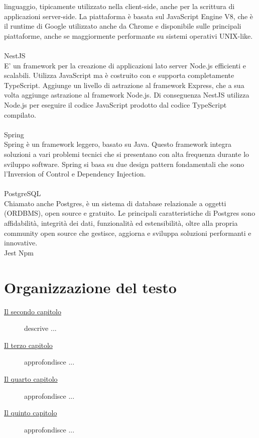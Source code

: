 linguaggio, tipicamente utilizzato nella client-side, anche per la scrittura di applicazioni server-side.
La piattaforma è basata sul JavaScript Engine V8, che è il runtime di Google utilizzato anche da Chrome e 
disponibile sulle principali piattaforme, anche se maggiormente performante su sistemi operativi UNIX-like.
\\\\
NestJS
\\
E' un framework per la creazione di applicazioni lato server Node.js efficienti e scalabili. 
Utilizza JavaScript ma è costruito con e supporta completamente TypeScript. Aggiunge un livello di astrazione
al framework Express, che a sua volta aggiunge astrazione al framework Node.js. Di conseguenza NestJS 
utilizza Node.js per eseguire il codice JavaScript prodotto dal codice TypeScript compilato.
\\\\
Spring
\\
Spring è un framework leggero, basato su Java. Questo framework integra soluzioni a vari problemi tecnici
che si presentano con alta frequenza durante lo sviluppo software. Spring si basa su due design pattern
fondamentali che sono l'Inversion of Control e Dependency Injection.
\\\\
PostgreSQL
\\
Chiamato anche Postgres, è un sistema di database relazionale a oggetti (ORDBMS), open source e 
gratuito.
Le principali caratteristiche di Postgres sono affidabilità, integrità dei dati, funzionalità ed estensibilità, 
oltre alla propria community open source che gestisce, aggiorna e sviluppa soluzioni performanti e innovative.
\\
Jest
Npm

\section{Organizzazione del testo}
\begin{description}
    \item[{\hyperref[cap:analisi-requisiti]{Il secondo capitolo}}] descrive ...
    
    \item[{\hyperref[cap:progettazione]{Il terzo capitolo}}] approfondisce ...
    
    \item[{\hyperref[cap:realizzazione-e-testing]{Il quarto capitolo}}] approfondisce ...
    
    \item[{\hyperref[cap:conclusioni]{Il quinto capitolo}}] approfondisce ...
\end{description}

